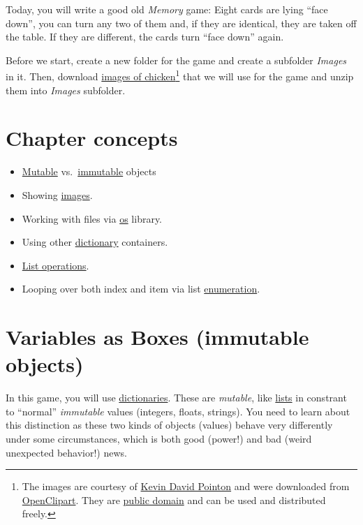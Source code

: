 \documentclass[
]{book}
\providecommand{\tightlist}{%
  \setlength{\itemsep}{0pt}\setlength{\parskip}{0pt}}
\begin{document}
Today, you will write a good old \emph{Memory} game: Eight cards are lying ``face down'', you can turn any two of them and, if they are identical, they are taken off the table. If they are different, the cards turn ``face down'' again.

Before we start, create a new folder for the game and create a subfolder \emph{Images} in it. Then, download \href{material/chicken.zip}{images of chicken}\footnote{The images are courtesy of \href{https://openclipart.org/artist/Firkin}{Kevin David Pointon} and were downloaded
  from \href{https://openclipart.org/}{OpenClipart}. They are \href{https://creativecommons.org/publicdomain/zero/1.0/}{public domain} and can be used and distributed freely.} that we will use for the game and unzip them into \emph{Images} subfolder.

\hypertarget{chapter-concepts-5}{%
\section{Chapter concepts}\label{chapter-concepts-5}}

\begin{itemize}
\tightlist
\item
  \protect\hyperlink{mutable-objects}{Mutable} vs.~\protect\hyperlink{variables-as-boxes-immutable-objects}{immutable} objects
\item
  Showing \protect\hyperlink{imagestim}{images}.
\item
  Working with files via \protect\hyperlink{os-library}{os} library.
\item
  Using other \protect\hyperlink{dictionaries}{dictionary} containers.
\item
  \protect\hyperlink{list-operations}{List operations}.
\item
  Looping over both index and item via list \protect\hyperlink{enumerate}{enumeration}.
\end{itemize}

\hypertarget{variables-as-boxes-immutable-objects}{%
\section{Variables as Boxes (immutable objects)}\label{variables-as-boxes-immutable-objects}}

In this game, you will use \protect\hyperlink{dictionaries}{dictionaries}. These are \emph{mutable}, like \protect\hyperlink{lists}{lists} in constrant to ``normal'' \emph{immutable} values (integers, floats, strings). You need to learn about this distinction as these two kinds of objects (values) behave very differently under some circumstances, which is both good (power!) and bad (weird unexpected behavior!) news.
\end{document}
